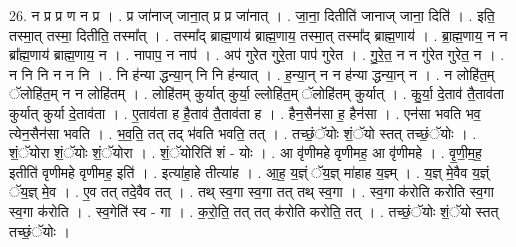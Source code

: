 \documentclass[17pt]{extarticle}
\begin{document}
26. न प्र प्र ण न प्र । . प्र जा॑नाज् जाना॒त् प्र प्र जा॑नात् । . जा॒ना॒ दितीति॑ जानाज् जाना॒ दिति॑ । . इति॒ तस्मा॒त् तस्मा॒ दितीति॒ तस्मा᳚त् । . तस्मा᳚द् ब्राह्म॒णाय॑ ब्राह्म॒णाय॒ तस्मा॒त् तस्मा᳚द् ब्राह्म॒णाय॑ । . ब्रा॒ह्म॒णाय॒ न न ब्रा᳚ह्म॒णाय॑ ब्राह्म॒णाय॒ न । . नापाप॒ न नाप॑ । . अप॑ गुरेत गुरे॒ता पाप॑ गुरेत । . गु॒रे॒त॒ न न गु॑रेत गुरेत॒ न । . न नि नि न न नि । . नि ह॑न्या द्धन्या॒न् नि नि ह॑न्यात् । . ह॒न्या॒न् न न ह॑न्या द्धन्या॒न् न । . न लोहि॑त॒म् ॅलोहि॑त॒म् न न लोहि॑तम् । . लोहि॑तम् कुर्यात् कुर्या॒ ल्लोहि॑त॒म् ॅलोहि॑तम् कुर्यात् । . कु॒र्या॒ दे॒ताव॑ तै॒ताव॑ता कुर्यात् कुर्या दे॒ताव॑ता । . ए॒ताव॑ता ह है॒ताव॑ तै॒ताव॑ता ह । . हैन॒सैन॑सा ह॒ हैन॑सा । . एन॑सा भवति भव॒ त्येन॒सैन॑सा भवति । . भ॒व॒ति॒ तत् तद् भ॑वति भवति॒ तत् । . तच्छं॒ॅयोः शं॒ॅयो स्तत् तच्छं॒ॅयोः । . शं॒ॅयोरा शं॒ॅयोः शं॒ॅयोरा । . शं॒ॅयोरिति॑ शं - योः । . आ वृ॑णीमहे वृणीमह॒ आ वृ॑णीमहे । . वृ॒णी॒म॒ह॒ इतीति॑ वृणीमहे वृणीमह॒ इति॑ । . इत्या॑हा॒हे तीत्या॑ह । . आ॒ह॒ य॒ज्ञ्ं ॅय॒ज्ञ् मा॑हाह य॒ज्ञ्म् । . य॒ज्ञ् मे॒वैव य॒ज्ञ्ं ॅय॒ज्ञ् मे॒व । . ए॒व तत् तदे॒वैव तत् । . तथ् स्व॒गा स्व॒गा तत् तथ् स्व॒गा । . स्व॒गा क॑रोति करोति स्व॒गा स्व॒गा क॑रोति । . स्व॒गेति॑ स्व - गा । . क॒रो॒ति॒ तत् तत् क॑रोति करोति॒ तत् । . तच्छं॒ॅयोः शं॒ॅयो स्तत् तच्छं॒ॅयोः । \newline
\end{document}
